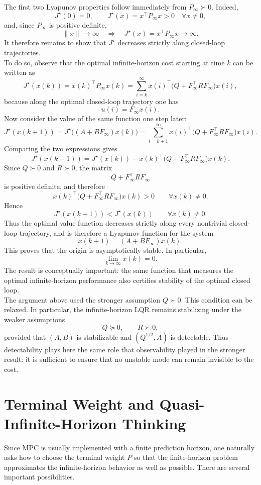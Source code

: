 The first two Lyapunov properties follow immediately from $P_\infty \succ 0$. Indeed,
\[
J^\star(0)=0,
\qquad
J^\star(x)=x^\top P_\infty x>0 \quad \forall x\neq 0,
\]
and, since $P_\infty$ is positive definite,
\[
\|x\|\to\infty \quad \Longrightarrow \quad J^\star(x)=x^\top P_\infty x \to \infty.
\]
It therefore remains to show that $J^\star$ decreases strictly along closed-loop trajectories.\\    
To do so, observe that the optimal infinite-horizon cost starting at time $k$ can be written as
\[
J^\star(x(k))
=
x(k)^\top P_\infty x(k)
=
\sum_{i=k}^{\infty} x(i)^\top \bigl(Q+F_\infty^\top R F_\infty\bigr)x(i),
\]
because along the optimal closed-loop trajectory one has
\[
u(i)=F_\infty x(i).
\]
Now consider the value of the same function one step later:
\[
J^\star(x(k+1))
=
J^\star\bigl((A+BF_\infty)x(k)\bigr)
=
\sum_{i=k+1}^{\infty} x(i)^\top \bigl(Q+F_\infty^\top R F_\infty\bigr)x(i).
\]
Comparing the two expressions gives
\[
J^\star(x(k+1))
=
J^\star(x(k))
-
x(k)^\top \bigl(Q+F_\infty^\top R F_\infty\bigr)x(k).
\]
Since $Q\succ 0$ and $R\succ 0$, the matrix
\[
Q+F_\infty^\top R F_\infty
\]
is positive definite, and therefore
\[
x(k)^\top \bigl(Q+F_\infty^\top R F_\infty\bigr)x(k)>0
\qquad \forall x(k)\neq 0.
\]
Hence
\[
J^\star(x(k+1))<J^\star(x(k))
\qquad \forall x(k)\neq 0.
\]
Thus the optimal value function decreases strictly along every nontrivial closed-loop trajectory, and is therefore a Lyapunov function for the system
\[
x(k+1)=(A+BF_\infty)x(k).
\]
This proves that the origin is asymptotically stable. In particular,
\[
\lim_{k\to\infty} x(k)=0.
\]
The result is conceptually important: the same function that measures the optimal infinite-horizon performance also certifies stability of the optimal closed loop.\\
The argument above used the stronger assumption $Q\succ 0$. This condition can be relaxed. In particular, the infinite-horizon LQR remains stabilizing under the weaker assumptions
\[
Q\succeq 0,
\qquad
R\succ 0,
\]
provided that $(A,B)$ is stabilizable and $(Q^{1/2},A)$ is detectable. Thus detectability plays here the same role that observability played in the stronger result: it is sufficient to ensure that no unstable mode can remain invisible to the cost.
\section{Terminal Weight and Quasi-Infinite-Horizon Thinking}

Since MPC is usually implemented with a finite prediction horizon, one naturally asks how to choose the terminal weight $P$ so that the finite-horizon problem approximates the infinite-horizon behavior as well as possible. There are several important possibilities.\\

